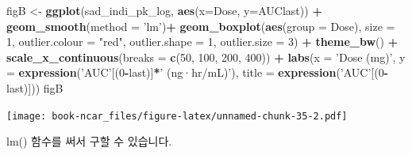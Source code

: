 \documentclass[12pt,]{krantz}
\newenvironment{Shaded}{\begin{snugshade}}{\end{snugshade}}
\newcommand{\KeywordTok}[1]{\textcolor[rgb]{0.13,0.29,0.53}{\textbf{#1}}}
\newcommand{\DataTypeTok}[1]{\textcolor[rgb]{0.13,0.29,0.53}{#1}}
\newcommand{\DecValTok}[1]{\textcolor[rgb]{0.00,0.00,0.81}{#1}}
\newcommand{\StringTok}[1]{\textcolor[rgb]{0.31,0.60,0.02}{#1}}
\newcommand{\OperatorTok}[1]{\textcolor[rgb]{0.81,0.36,0.00}{\textbf{#1}}}
\newcommand{\NormalTok}[1]{#1}
\theoremstyle{definition}
\theoremstyle{definition}
\theoremstyle{definition}
\theoremstyle{remark}
\begin{document}
\begin{Shaded}
\begin{Highlighting}[]
\NormalTok{figB <-}\StringTok{ }\KeywordTok{ggplot}\NormalTok{(sad_indi_pk_log, }\KeywordTok{aes}\NormalTok{(}\DataTypeTok{x=}\NormalTok{Dose, }\DataTypeTok{y=}\NormalTok{AUClast)) }\OperatorTok{+}
\StringTok{  }\KeywordTok{geom_smooth}\NormalTok{(}\DataTypeTok{method =} \StringTok{'lm'}\NormalTok{)}\OperatorTok{+}
\StringTok{  }\KeywordTok{geom_boxplot}\NormalTok{(}\KeywordTok{aes}\NormalTok{(}\DataTypeTok{group =}\NormalTok{ Dose), }
               \DataTypeTok{size =} \DecValTok{1}\NormalTok{, }
               \DataTypeTok{outlier.colour =} \StringTok{"red"}\NormalTok{, }
               \DataTypeTok{outlier.shape =} \DecValTok{1}\NormalTok{, }
               \DataTypeTok{outlier.size =} \DecValTok{3}\NormalTok{) }\OperatorTok{+}
\StringTok{  }\KeywordTok{theme_bw}\NormalTok{() }\OperatorTok{+}
\StringTok{  }\KeywordTok{scale_x_continuous}\NormalTok{(}\DataTypeTok{breaks =} \KeywordTok{c}\NormalTok{(}\DecValTok{50}\NormalTok{, }\DecValTok{100}\NormalTok{, }\DecValTok{200}\NormalTok{, }\DecValTok{400}\NormalTok{)) }\OperatorTok{+}
\StringTok{  }\KeywordTok{labs}\NormalTok{(}\DataTypeTok{x =} \StringTok{'Dose (mg)'}\NormalTok{, }\DataTypeTok{y =} \KeywordTok{expression}\NormalTok{(}\StringTok{'AUC'}\NormalTok{[(}\DecValTok{0}\OperatorTok{-}\NormalTok{last)]}\OperatorTok{*}\StringTok{' (ng·hr/mL)'}\NormalTok{),}
       \DataTypeTok{title =} \KeywordTok{expression}\NormalTok{(}\StringTok{'AUC'}\NormalTok{[(}\DecValTok{0}\OperatorTok{-}\NormalTok{last)]))}
\NormalTok{figB}
\end{Highlighting}
\end{Shaded}

\texttt{[image: book-ncar\_files/figure-latex/unnamed-chunk-35-2.pdf]}

lm() 함수를 써서 구할 수 있습니다.
\end{document}
